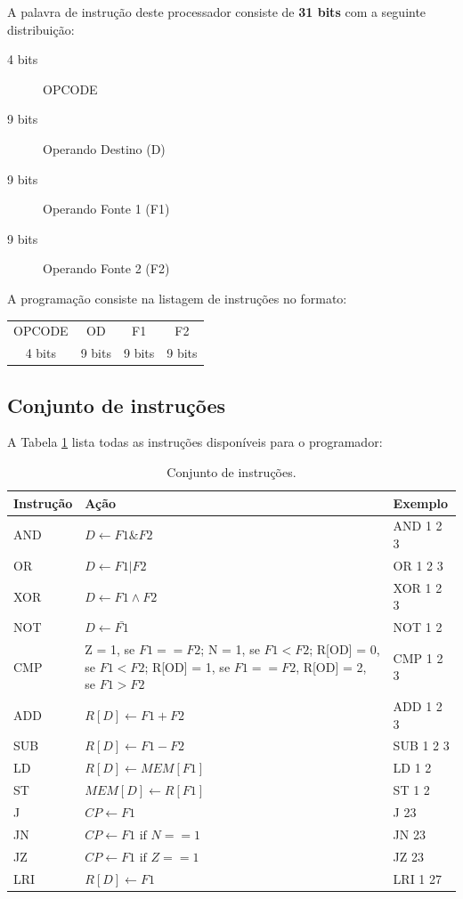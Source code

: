 \documentclass[a4paper]{article}
\begin{document}
A palavra de instrução deste processador consiste de \textbf{31 bits} com a seguinte distribuição:

\begin{description}
    \item [4 bits] OPCODE
    \item [9 bits] Operando Destino (D)
    \item [9 bits] Operando Fonte 1 (F1)
    \item [9 bits] Operando Fonte 2 (F2)
\end{description}

A programação consiste na listagem de instruções no formato:

\begin{center}
\begin{tabular}{|c|c|c|c|}
	\hline
	OPCODE & OD & F1 & F2\\
	4 bits & 9 bits & 9 bits & 9 bits\\
	\hline
\end{tabular}
\end{center}

\subsection{Conjunto de instruções}
\label{sec:conj}

A Tabela \ref{tab:inst} lista todas as instruções disponíveis para o
programador:

\begin{table}[H]
\centering
\begin{tabular}{l | p{8cm} | l}
Instrução & Ação & Exemplo\\
	\hline
    AND & $D \leftarrow F1 \& F2$ & AND 1 2 3\\
    OR  & $D \leftarrow F1 | F2$ & OR 1 2 3\\
    XOR & $D \leftarrow F1 \wedge F2$ & XOR 1 2 3\\
    NOT & $D \leftarrow \bar{F1}$ & NOT 1 2\\
    CMP & Z = 1, se $F1==F2$; N = 1, se $F1 < F2$; R[OD] = 0, se $F1 < F2$; R[OD] = 1, se $F1 == F2$, R[OD] = 2, se $F1 > F2$ & CMP 1 2 3\\
    ADD & $R[D] \leftarrow F1 + F2$ & ADD 1 2 3\\
    SUB & $R[D] \leftarrow F1 - F2$ & SUB 1 2 3\\
    LD  & $R[D] \leftarrow MEM[F1]$ & LD 1 2\\
    ST  & $MEM[D] \leftarrow R[F1]$ & ST 1 2\\
    J   & $CP \leftarrow F1$ & J 23\\
    JN  & $CP \leftarrow F1 \text{ if } N == 1$ & JN 23\\
    JZ  & $CP \leftarrow F1 \text{ if } Z == 1$ & JZ 23\\
    LRI & $R[D] \leftarrow F1$ & LRI 1 27\\
\end{tabular}
\label{tab:inst}
\caption{Conjunto de instruções.}
\end{table}
\end{document}
